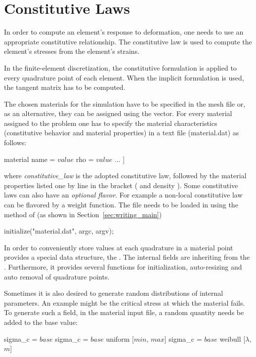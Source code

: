 \section{Constitutive Laws \label{sect:smm:CL}}
In order to compute an element's response to deformation, one needs to
use an appropriate constitutive relationship. The constitutive law is
used to compute the element's stresses from the element's strains.

In the finite-element discretization, the constitutive formulation is
applied to every quadrature point of each element. When the implicit
formulation is used, the tangent matrix has to be computed.

The chosen materials for the simulation have to be specified in the
mesh file or, as an alternative, they can be assigned using the
 vector.  For every material assigned to the
problem one has to specify the material characteristics (constitutive
behavior and material properties) in a text file (\eg material.dat) as
follows:
\begin{cpp}
  material %
     name = $value$
     rho = $value$
     ...
  ]
\end{cpp}
 where \emph{constitutive\_law} is the adopted
constitutive law, followed by the material properties listed one by line in the
bracket (\eg {} and density ). Some constitutive laws can
also have an \emph{optional flavor}. For example a non-local constitutive law
can be flavored by a weight function. The file needs to be loaded in \akantu
using the  method of \akantu (as shown in
Section~\ref{sec:writing_main})
\begin{cpp}
  initialize("material.dat", argc, argv);
\end{cpp}

In order to conveniently store values at each quadrature in a material
point \akantu provides a special data structure, the
. The internal fields are inheriting from the
.  Furthermore, it provides several functions for
initialization, auto-resizing and auto removal of quadrature points.

Sometimes it is also desired to generate random distributions of
internal parameters. An example might be the critical stress at which the
material fails. To generate such a field, in the material input file,
a random quantity needs be added to the base value:
\begin{cpp}
  sigma_c = $base$
  sigma_c = $base$ uniform [$min$, $max$]
  sigma_c = $base$ weibull [$\lambda$, $m$]
\end{cpp}

